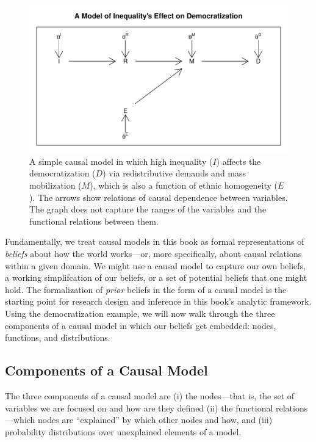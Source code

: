 \documentclass[
  12pt,
]{book}
\begin{document}
\begin{figure}

{\centering \includegraphics[width=0.8\linewidth]{ii_files/figure-latex/simpleDAG-1} 

}

\caption{A simple causal model in which high inequality ($I$) affects the democratization ($D$) via redistributive demands and mass mobilization ($M$), which is also a function of ethnic homogeneity ($E$). The arrows show relations of causal dependence between variables.  The graph does not capture the ranges of the variables and the functional relations between them.}\label{fig:simpleDAG}
\end{figure}

Fundamentally, we treat causal models in this book as formal representations of \emph{beliefs} about how the world works---or, more specifically, about causal relations within a given domain. We might use a causal model to capture our own beliefs, a working simplifcation of our beliefs, or a set of potential beliefs that one might hold. The formalization of \emph{prior} beliefs in the form of a causal model is the starting point for research design and inference in this book's analytic framework. Using the democratization example, we will now walk through the three components of a causal model in which our beliefs get embedded: nodes, functions, and distributions.

\hypertarget{components-of-a-causal-model}{%
\subsection{Components of a Causal Model}\label{components-of-a-causal-model}}

The three components of a causal model are (i) the nodes---that is, the set of variables we are focused on and how are they defined (ii) the functional relations---which nodes are ``explained'' by which other nodes and how, and (iii) probability distributions over unexplained elements of a model.
\end{document}
